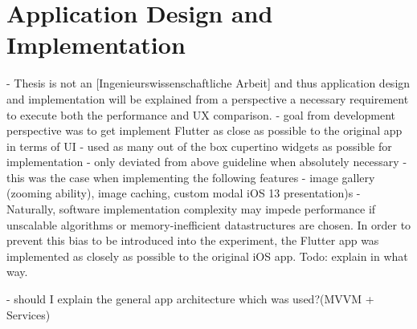 \chapter{Application Design and Implementation}
- Thesis is not an [Ingenieurswissenschaftliche Arbeit] and thus application design and implementation will be explained from a perspective
a necessary requirement to execute both the performance and UX comparison.
- goal from development perspective was to get implement Flutter as close as possible to the original app in terms of UI
- used as many out of the box cupertino widgets as possible for implementation
- only deviated from above guideline when absolutely necessary
- this was the case when implementing the following features
- image gallery (zooming ability), image caching, custom modal iOS 13 presentation)s
- Naturally, software implementation complexity may impede performance if unscalable algorithms or memory-inefficient datastructures are chosen.
In order to prevent this bias to be introduced into the experiment, the Flutter app was implemented as closely as possible to the original iOS app. Todo: explain in what way.

- should I explain the general app architecture which was used?(MVVM + Services)

